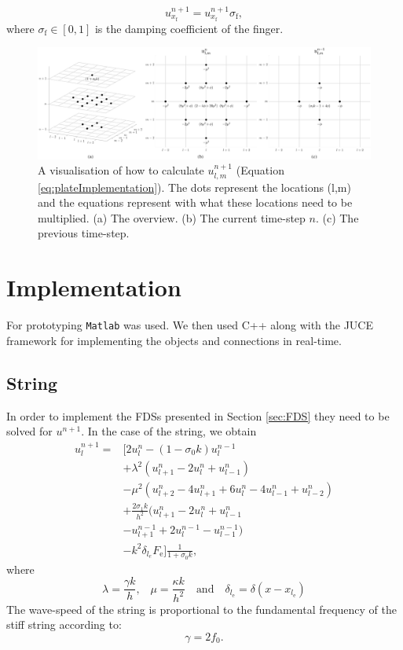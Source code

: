 \documentclass{article}
\begin{document}
\begin{equation}
    u_{x_\text{f}}^{n+1} = u_{x_\text{f}}^{n+1}  \sigma_\text{f},
\end{equation}
where $\sigma_\text{f} \in [0,1]$ is the damping coefficient of the finger. 
\begin{figure}[t]
    \centering
    \includegraphics[width=2.1\columnwidth]{FDSPlateUTot}
    \caption{A visualisation of how to calculate $u_{l,m}^{n+1}$ (Equation \eqref{eq:plateImplementation}). The dots represent the locations (l,m) and the equations represent with what these locations need to be multiplied. (a) The overview. (b) The current time-step $n$. (c) The previous time-step.  \label{fig:example}}
 \end{figure}
\section{Implementation}
For prototyping \texttt{Matlab} was used. We then used C++ along with the JUCE framework for implementing the objects and connections in real-time.
\subsection{String}
In order to implement the FDSs presented in Section \ref{sec:FDS} they need to be solved for $u^{n+1}$. In the case of the string, we obtain
\begin{equation}
    \begin{aligned}\label{eq:stringImplementatino}
        u_l^{n+1} = &\Big[2u_l^n - (1 - \sigma_0k) u_l^{n-1} \\
        & +\lambda^2(u_{l+1}^n - 2u_l^n + u_{l-1}^n)\\
        &- \mu^2(u_{l+2}^n - 4u_{l+1}^n + 6u_l^n - 4u_{l-1}^n + u_{l-2}^n) \\
        &+ \frac{2\sigma_1k}{h^2}(u_{l+1}^n - 2u_l^n + u_{l-1}^n\\
        &- u_{l+1}^{n-1} + 2u_l^{n-1} - u_{l-1}^{n-1})\\
        &-k^2\delta_{l_e}F_\text{e}\Big] \frac{1}{1 + \sigma_0k},
    \end{aligned}
\end{equation}
where
\begin{equation}\nonumber
\lambda = \frac{\gamma k}{h}\text{,} \quad \mu =  \frac{\kappa k}{h^2} \quad \text{and} \quad \delta_{l_\text{e}} = \delta(x-x_{l_\text{e}}) 
\end{equation}
The wave-speed of the string is proportional to the fundamental frequency of the stiff string according to: 
\begin{equation}
    \gamma = 2 f_0.
\end{equation}
\end{document}
